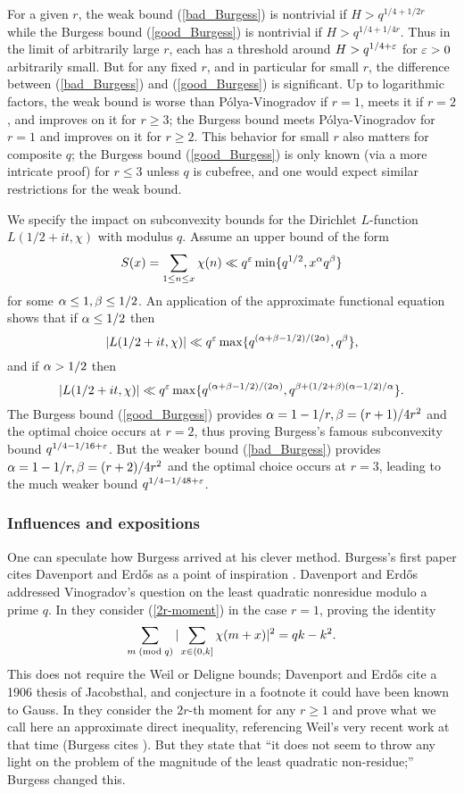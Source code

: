 \documentclass[oneside,11pt]{amsart}
\begin{document}
  
For a given $r$, the weak bound (\ref{bad_Burgess}) is nontrivial if $H> q^{1/4 + 1/2r}$ while the Burgess bound (\ref{good_Burgess}) is nontrivial if $H> q^{1/4 + 1/4r}$. Thus in the limit of arbitrarily large $r$, each has a threshold around $H>q^{1/4 + \varepsilon}$ for $\varepsilon>0$ arbitrarily small. But for any fixed $r$, and in particular for small $r$, the difference between (\ref{bad_Burgess}) and (\ref{good_Burgess}) is significant. Up to logarithmic factors, the weak bound is worse than P\'olya-Vinogradov if $r=1$, meets it if $r=2$, and improves on it for $r \geq 3$; the Burgess bound meets P\'olya-Vinogradov for $r=1$ and improves on it for $r \geq 2$.  This behavior for small $r$ also matters for composite $q$; the Burgess bound (\ref{good_Burgess}) is only known (via a more intricate proof) for $r \leq 3$ unless $q$ is cubefree, and one would expect similar restrictions for the weak bound. 

We specify the impact on subconvexity bounds for the Dirichlet $L$-function $L(1/2 + it, \chi)$ with modulus $q$. Assume an upper bound of the form
\[S(x) = \sum_{1 \leq n \leq x} \chi (n) \ll q^\varepsilon \min \{ q^{1/2}, x^\alpha q^\beta\}\]
 for some $\alpha \leq 1, \beta \leq 1/2$. An application of the approximate functional equation  \cite[Ch. 12]{IK} shows that 
   if $\alpha \leq 1/2$ then 
 \[ |L(1/2 +it, \chi)| \ll q^{\varepsilon} \max\{ q^{(\alpha + \beta -1/2)/(2\alpha)}, q^\beta\},\]
and   if $\alpha > 1/2$ then
  \[  |L(1/2 +it, \chi)| \ll q^\varepsilon \max\{ q^{(\alpha + \beta -1/2)/(2\alpha)}, q^{\beta + (1/2 + \beta)(\alpha-1/2)/\alpha}\}.\]
The Burgess bound (\ref{good_Burgess})   provides $\alpha=1-1/r, \beta = (r+1)/4r^2$ and the optimal choice occurs at $r=2$, thus proving Burgess's famous subconvexity bound $q^{1/4-1/16+ \varepsilon}$. But the weaker bound (\ref{bad_Burgess}) provides $\alpha=1-1/r, \beta = (r+2)/4r^2$ and the optimal choice occurs at $r=3$, leading to the much weaker bound $q^{1/4 - 1/48 + \varepsilon}$. 
 
 
 
\subsubsection{Influences and expositions}
 One can speculate how Burgess arrived at his  clever method. 
 Burgess's first paper cites  Davenport and Erd\H{o}s \cite{DavErd52} as a point of inspiration \cite[Lemma 2, p. 108]{Bur57}. Davenport and Erd\H{o}s  addressed Vinogradov's question on the least quadratic nonresidue modulo a prime $q$.
 In \cite[Lemma 1]{DavErd52} they consider (\ref{2r-moment}) in the case $r=1$, proving the identity 
 \[ \sum_{m \; ( \text{mod} \; q)} | \sum_{x \in (0,k]} \chi (m+x)|^2 = qk -k^2.\]
This does not require the Weil or Deligne bounds;  Davenport and Erd\H{o}s cite a 1906 thesis of Jacobsthal, and conjecture in a footnote it could have been known to Gauss. 
In \cite[Lemma 3]{DavErd52}   they consider the $2r$-th moment   for any $r \geq 1$ and prove what we call here an approximate direct inequality, referencing Weil's very recent work at that time (Burgess cites \cite[\S IV]{Wei45}). But they state that ``it does not seem to throw any light on the problem of the magnitude of the least quadratic non-residue;'' Burgess changed this.
\end{document}
